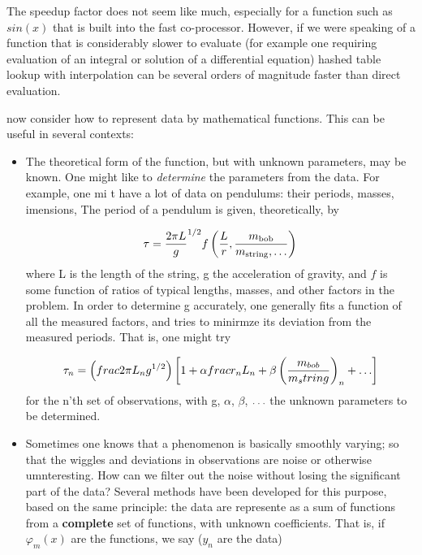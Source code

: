 The speedup factor does not seem like much, especially for a
function such as $sin(x)$ that is built into the fast co-processor. However, if we were speaking of a function that is considerably slower to evaluate (for example one requiring evaluation of an integral or solution of a differential equation) hashed table lookup with interpolation can be several orders of magnitude faster than direct evaluation.

 now consider how to represent data by mathematical functions. This can be useful in several contexts:

\begin{itemize}
    \item The theoretical form of the function, but with unknown parameters, may be known. One might like to \textit{determine} the parameters from the data. For example, one mi t have a lot of data on pendulums: their periods, masses, imensions, \etc The period of a pendulum is given, theoretically, by
    
    \begin{equation}
    \tau = \frac{2\pi L}{g}^{1/2} f\left( \frac{L}{r},\frac{m_{\text{bob}}}{m_{\text{string}},\mathellipsis}\right)
    \end{equation}
    where L is the length of the string, g the acceleration of gravity, and $f$ is some function of ratios of typical lengths, masses, and other factors in the problem. In order to determine g accurately, one generally fits a function of all the measured factors, and tries to minirmze its deviation from the measured periods. That is, one might try
    
    \begin{equation}
    \tau_{n} = \left(frac{2\pi L_{n}}{g}^{1/2}\right) \left[ 1 + \alpha frac{r_{n}}{L_{n}} + \beta\left(\frac{m_{bob}}{m_string}\right)_{n} + \mathellipsis\right]
    \end{equation}
    for the n'th set of observations, with g, $\alpha$, $\beta$, $\mathellipsis$ the unknown parameters to be determined.
    
    \item Sometimes one knows that a phenomenon is basically smoothly varying; so that the wiggles and deviations in observations are noise or otherwise umnteresting. How can we filter out the noise without losing the significant part of the data? Several methods have been developed for this purpose, based on the same principle: the data are represente as a sum of functions from a \textbf{complete} set of functions, with unknown coefficients. That is, if $\varphi_{m}(x)$ are the functions, we say ($y_n$ are the data)


\end{itemize}
